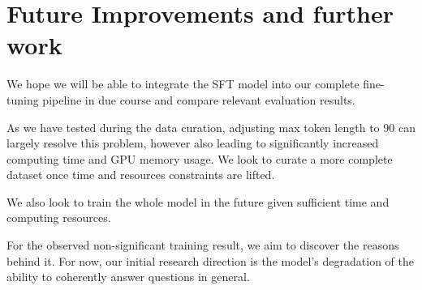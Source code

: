 \section{Future Improvements and further work}
We hope we will be able to integrate the SFT model into our complete fine-tuning pipeline in due course and compare relevant evaluation results.

As we have tested during the data curation, adjusting max token length to 90 can largely resolve this problem, however also leading to significantly increased computing time and GPU memory usage. We look to curate a more complete dataset once time and resources constraints are lifted.

We also look to train the whole model in the future given sufficient time and computing resources.

For the observed non-significant training result, we aim to discover the reasons behind it. For now, our initial research direction is the model's degradation of the ability to coherently answer questions in general.